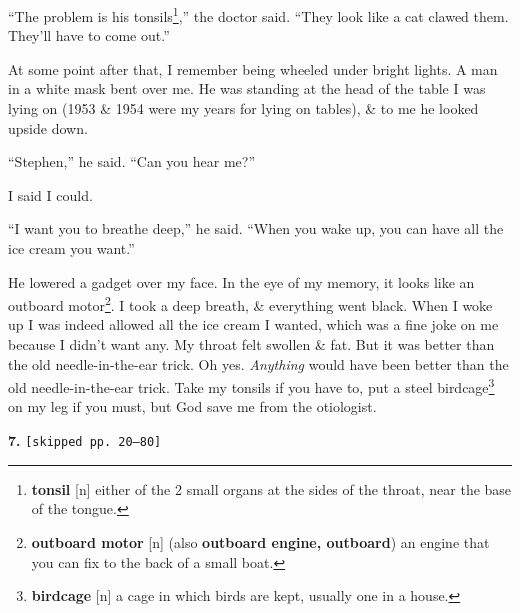 \documentclass[oneside]{book}
\numberwithin{equation}{section}
\begin{document}
``The problem is his tonsils\footnote{\textbf{tonsil} [n] either of the 2 small organs at the sides of the throat, near the base of the tongue.},'' the doctor said. ``They look like a cat clawed them. They'll have to come out.''

At some point after that, I remember being wheeled under bright lights. A man in a white mask bent over me. He was standing at the head of the table I was lying on (1953 \& 1954 were my years for lying on tables), \& to me he looked upside down.

``Stephen,'' he said. ``Can you hear me?''

I said I could.

``I want you to breathe deep,'' he said. ``When you wake up, you can have all the ice cream you want.''

He lowered a gadget over my face. In the eye of my memory, it looks like an outboard motor\footnote{\textbf{outboard motor} [n] (also \textbf{outboard engine, outboard}) an engine that you can fix to the back of a small boat.}. I took a deep breath, \& everything went black. When I woke up I was indeed allowed all the ice cream I wanted, which was a fine joke on me because I didn't want any. My throat felt swollen \& fat. But it was better than the old needle-in-the-ear trick. Oh yes. \textit{Anything} would have been better than the old needle-in-the-ear trick. Take my tonsils if you have to, put a steel birdcage\footnote{\textbf{birdcage} [n] a cage in which birds are kept, usually one in a house.} on my leg if you must, but God save me from the otiologist.

\textbf{7.} \texttt{[skipped pp. 20--80]}
\end{document}
